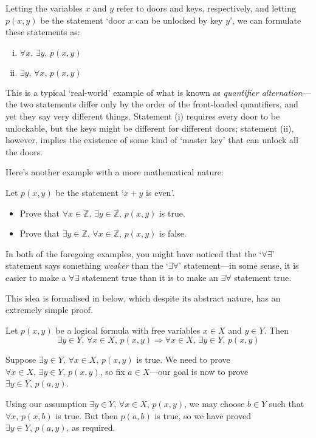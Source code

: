 Letting the variables $x$ and $y$ refer to doors and keys, respectively, and letting $p(x,y)$ be the statement `door $x$ can be unlocked by key $y$', we can formulate these statements as:
\begin{enumerate}[(i)] 
\item $\forall x,\, \exists y,\, p(x,y)$
\item $\exists y,\, \forall x,\, p(x,y)$
\end{enumerate}

This is a typical `real-world' example of what is known as \textit{quantifier alternation}---the two statements differ only by the order of the front-loaded quantifiers, and yet they say very different things. Statement (i) requires every door to be unlockable, but the keys might be different for different doors; statement (ii), however, implies the existence of some kind of `master key' that can unlock all the doors.

Here's another example with a more mathematical nature:

\begin{exercise}
Let $p(x,y)$ be the statement `$x + y$ is even'.
\begin{itemize}
\item Prove that $\forall x \in \mathbb{Z},\, \exists y \in \mathbb{Z},\, p(x,y)$ is true.
\item Prove that $\exists y \in \mathbb{Z},\, \forall x \in \mathbb{Z},\, p(x,y)$ is false.
\end{itemize}
\end{exercise}

In both of the foregoing examples, you might have noticed that the `$\forall\exists$' statement says something \textit{weaker} than the `$\exists\forall$' statement---in some sense, it is easier to make a $\forall\exists$ statement true than it is to make an $\exists\forall$ statement true.

This idea is formalised in  below, which despite its abstract nature, has an extremely simple proof.

\begin{theorem} \label{thmQuantifierAlternation}
Let $p(x,y)$ be a logical formula with free variables $x \in X$ and $y \in Y$. Then
\[\exists y \in Y,\, \forall x \in X,\, p(x,y) \Rightarrow \forall x \in X,\, \exists y \in Y,\, p(x,y)\]
\end{theorem}

\begin{cproof}
Suppose $\exists y \in Y,\, \forall x \in X,\, p(x,y)$ is true. We need to prove $\forall x \in X,\, \exists y \in Y,\, p(x,y)$, so fix $a \in X$---our goal is now to prove $\exists y \in Y,\, p(a,y)$.

Using our assumption $\exists y \in Y,\, \forall x \in X,\, p(x,y)$, we may choose $b \in Y$ such that $\forall x,\, p(x,b)$ is true. But then $p(a, b)$ is true, so we have proved $\exists y \in Y,\, p(a,y)$, as required.
\end{cproof}

